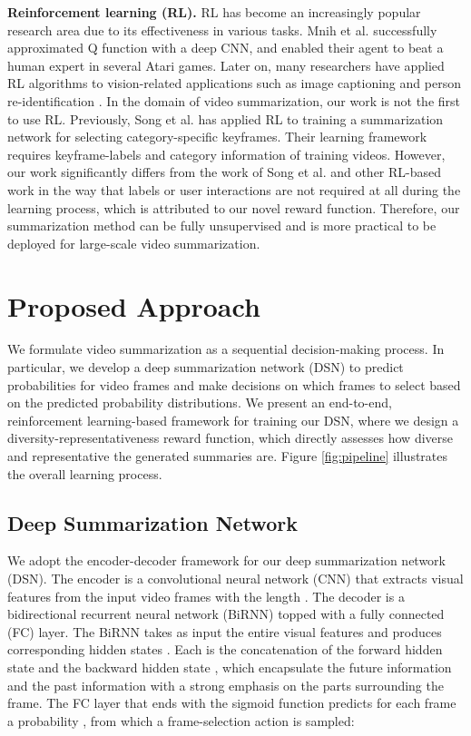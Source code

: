 \documentclass[letterpaper]{article} \usepackage{aaai18}  \usepackage{times}  \usepackage{helvet}  \usepackage{courier}  \usepackage{url}  \usepackage{graphicx}
\begin{document}
{\bf Reinforcement learning (RL).}
RL has become an increasingly popular research area due to its effectiveness in various tasks. Mnih et al. \cite{mnih2013playing} successfully approximated Q function with a deep CNN, and enabled their agent to beat a human expert in several Atari games. Later on, many researchers have applied RL algorithms to vision-related applications such as image captioning \cite{xu2015show} and person re-identification \cite{xulan2017reid}. In the domain of video summarization, our work is not the first to use RL. Previously, Song et al. \cite{song2016category} has applied RL to training a summarization network for selecting category-specific keyframes. Their learning framework requires keyframe-labels and category information of training videos. However, our work significantly differs from the work of Song et al. and other RL-based work in the way that labels or user interactions are not required at all during the learning process, which is attributed to our novel reward function. Therefore, our summarization method can be fully unsupervised and is more practical to be deployed for large-scale video summarization.

\section{Proposed Approach}
We formulate video summarization as a sequential decision-making process. In particular, we develop a deep summarization network (DSN) to predict probabilities for video frames and make decisions on which frames to select based on the predicted probability distributions. We present an end-to-end, reinforcement learning-based framework for training our DSN, where we design a diversity-representativeness reward function, which directly assesses how diverse and representative the generated summaries are. Figure \ref{fig:pipeline} illustrates the overall learning process.

\subsection{Deep Summarization Network}
We adopt the encoder-decoder framework for our deep summarization network (DSN). The encoder is a convolutional neural network (CNN) that extracts visual features  from the input video frames  with the length . The decoder is a bidirectional recurrent neural network (BiRNN) topped with a fully connected (FC) layer. The BiRNN takes as input the entire visual features  and produces corresponding hidden states . Each  is the concatenation of the forward hidden state  and the backward hidden state , which encapsulate the future information and the past information with a strong emphasis on the parts surrounding the  frame. The FC layer that ends with the sigmoid function predicts for each frame a probability , from which a frame-selection action  is sampled:
\end{document}
